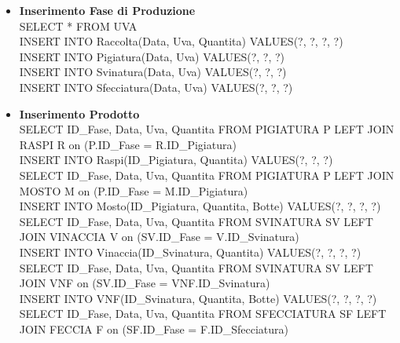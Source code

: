 \documentclass{article}
\begin{document}
\begin{itemize}
\item \textbf{Inserimento Fase di Produzione}\\\newline
SELECT * FROM UVA\\\newline
INSERT INTO Raccolta(Data, Uva, Quantita) VALUES(?, ?, ?, ?)\\\newline
INSERT INTO Pigiatura(Data, Uva) VALUES(?, ?, ?)\\\newline
INSERT INTO Svinatura(Data, Uva) VALUES(?, ?, ?)\\\newline
INSERT INTO Sfecciatura(Data, Uva) VALUES(?, ?, ?)\\\newline
\newpage
\item \textbf{Inserimento Prodotto}\\\newline
SELECT ID\_Fase, Data, Uva, Quantita FROM PIGIATURA P LEFT JOIN RASPI R on (P.ID\_Fase = R.ID\_Pigiatura)\\\newline
INSERT INTO Raspi(ID\_Pigiatura, Quantita) VALUES(?, ?, ?)\\\newline
SELECT ID\_Fase, Data, Uva, Quantita FROM PIGIATURA P LEFT JOIN MOSTO M on (P.ID\_Fase = M.ID\_Pigiatura)\\\newline
INSERT INTO Mosto(ID\_Pigiatura, Quantita, Botte) VALUES(?, ?, ?, ?)\\\newline
SELECT ID\_Fase, Data, Uva, Quantita FROM SVINATURA SV LEFT JOIN VINACCIA V on (SV.ID\_Fase = V.ID\_Svinatura)\\\newline
INSERT INTO Vinaccia(ID\_Svinatura, Quantita) VALUES(?, ?, ?, ?)\\\newline
SELECT ID\_Fase, Data, Uva, Quantita FROM SVINATURA SV LEFT JOIN VNF on (SV.ID\_Fase = VNF.ID\_Svinatura)\\\newline
INSERT INTO VNF(ID\_Svinatura, Quantita, Botte) VALUES(?, ?, ?, ?)\\\newline
SELECT ID\_Fase, Data, Uva, Quantita FROM SFECCIATURA SF LEFT JOIN FECCIA F on (SF.ID\_Fase = F.ID\_Sfecciatura)\\\newline

\end{itemize}
\end{document}
